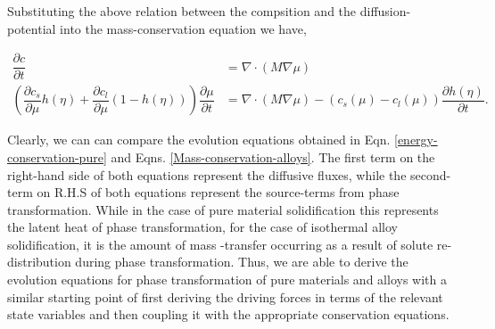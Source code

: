 \documentclass[english]{iambook}
\begin{document}
 Substituting the above relation between the compsition and the diffusion-potential
 into the mass-conservation equation we have, 
 
 \begin{align}
  \dfrac{\partial c}{\partial t} &= \nabla \cdot \left(M\nabla\mu\right)\\
 \left(\dfrac{\partial c_s}{\partial \mu}h\left(\eta\right) + \dfrac{\partial c_l}{\partial \mu}(1-h\left(\eta\right))\right)
 \dfrac{\partial \mu}{\partial t} &= \nabla \cdot \left(M\nabla\mu\right) 
 - \left(c_s\left(\mu\right) - c_l \left(\mu\right)\right)\dfrac{\partial h\left(\eta\right)}{\partial t}.
 \label{Mass-conservation-alloys}
 \end{align}
 
 Clearly, we can can compare the evolution equations obtained in 
 Eqn. \ref{energy-conservation-pure} and Eqns. \ref{Mass-conservation-alloys}.
 The first term on the right-hand side of both equations represent the
 diffusive fluxes, while the second-term on R.H.S of both equations represent
 the source-terms from phase transformation. While in the case of pure 
 material solidification this represents the latent heat of phase transformation, 
 for the case of isothermal alloy solidification, it is the amount of mass
 -transfer occurring as a result of solute re-distribution during phase transformation.
 Thus, we are able to derive the evolution equations for phase transformation of pure
 materials and alloys with a similar starting point of first deriving the driving 
 forces in terms of the relevant state variables and then coupling it with the 
 appropriate conservation equations.
\end{document}
